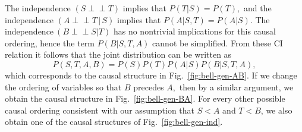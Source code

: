 \documentclass[letterpaper,onecolumn,nofootinbib]{revtex4}
\def\indep{\perp\!\!\!\!\perp}
\begin{document}
The independence $\left( S\indep T\right) $ implies that $P(T|S)=P(T),$ and
the independence $\left( A\indep T\,|\,S\right) $ implies that $P(A|S,T)=P(A|S)$.
The independence$\ \left( B\indep S|T\right) $ has no nontrivial implications
for this causal ordering, hence the term $P(B|S,T,A)$ cannot be simplified. From these CI relation it
follows that the joint distribution can be written as
\begin{equation*}
P(S,T,A,B)=P(S)P(T)P(A|S)P(B|S,T,A),
\end{equation*}%
which corresponds to the causal structure in Fig.~\ref{fig:bell-gen-AB}. If we change the
ordering of variables so that $B$ precedes $A,$ then by a similar argument,
we obtain the causal structure in Fig.~\ref{fig:bell-gen-BA}.  For every other possible causal ordering consistent with our assumption that $S<A$ and $T<B$, we also obtain one of the causal structures of Fig.~\ref{fig:bell-gen-ind}.
\end{document}
